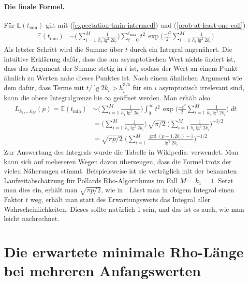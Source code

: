 \documentclass[a4paper, 10pt, ngerman]{article}
\newcommand{\E}{\mathbb{E}}
\begin{document}
\paragraph*{Die finale Formel.} Für $\E(t_{\min})$ gilt mit (\ref{expectation-tmin-intermed}) und (\ref{prob-at-least-one-coll})
\begin{align*}
    \E(t_{\min})
     & \sim \Bigg ( \sum_{i = 1}^M \frac 1 {h_i \lg^2 2k_i} \Bigg )
    \sum_{t = 0}^{t_{\max}} t^2 \, \exp \Bigg ( \frac {-t^2} 2
    \sum_{i = 1}^M \frac 1 {h_i \lg^2 2k_i} \Bigg )
\end{align*}
Als letzter Schritt wird die Summe über $t$ durch ein Integral angenähert. Die intuitive Erklärung dafür, dass das am asymptotischen Wert nichts ändert ist, dass das Argument der Summe stetig in $t$ ist, sodass der Wert an einem Punkt ähnlich zu Werten nahe dieses Punktes ist. Nach einem ähnlichen Argument wie dem dafür, dass Terme mit $t/\lg 2k_i > h_i^{3/5}$ für ein $i$ asymptotisch irrelevant sind, kann die obere Integralgrenze bis $\infty$ geöffnet werden. Man erhält also
\begin{align}
    L_{k_1, \dots k_M}(p) = \E(t_{\min})
     & \sim \Bigg ( \sum_{i = 1}^M \frac 1 {h_i \lg^2 2k_i} \Bigg )
    \int_{0}^{\infty} t^2 \, \exp \Bigg ( \frac {-t^2} 2
    \sum_{i = 1}^M \frac 1 {h_i \lg^2 2k_i} \Bigg ) \; dt
    \nonumber                                                       \\
     & = \Bigg (\sum_{i = 1}^M \frac 1 {h_i \lg^2 2k_i} \Bigg ) \,
    \sqrt {\pi / 2} \
    \Bigg ( \sum_{i = 1}^M \frac 1 {h_i \lg^2 2k_i} \Bigg )^{-3/2}
    \nonumber                                                       \\
     & = \sqrt{\pi p / 2} \; \Bigg (
    \sum_{i = 1}^M \frac {\gcd(p - 1, 2k_i) - 1} {\lg^2 2k_i} \Bigg )^{-1/2}
    \label{expectation-tmin}
\end{align}
Zur Auswertung des Integrals wurde die Tabelle in Wikipedia: \cite{gint} verwendet. Man kann sich auf mehereren Wegen davon überzeugen, dass die Formel trotz der vielen Näherungen stimmt. Beispielsweise ist sie verträglich mit der bekannten Laufzeitabschätzung für Pollards Rho-Algorithmus im Fall $M = k_1 = 1$. Setzt man dies ein, erhält man $\sqrt{\pi p / 2}$, wie in \cite{pol75}. Lässt man in obigem Integral einen Faktor $t$ weg, erhält man statt des Erwartungswerts das Integral aller Wahrscheinlichkeiten. Dieses sollte natürlich 1 sein, und das ist es auch, wie man leicht nachrechnet.

\section{Die erwartete minimale Rho-Länge bei mehreren Anfangswerten}
\end{document}
